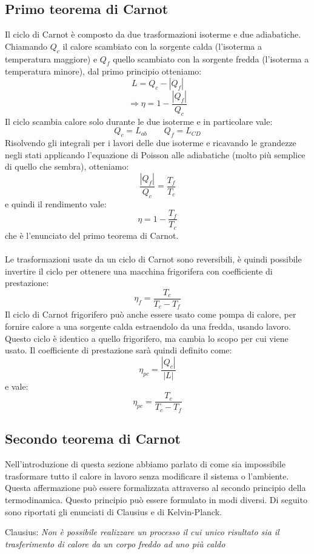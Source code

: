 \documentclass{article}
\begin{document}
\subsection{Primo teorema di Carnot}
Il ciclo di Carnot è composto da due trasformazioni isoterme e due adiabatiche. Chiamando $Q_c$ il calore scambiato con la sorgente calda (l'isoterma a temperatura maggiore) e $Q_f$ quello scambiato con la sorgente fredda (l'isoterma a temperatura minore), dal primo principio otteniamo:
$$ L = Q_c - |Q_f| $$
$$ \Rightarrow \eta = 1 - \frac{|Q_f|}{Q_c} $$
Il ciclo scambia calore solo durante le due isoterme e in particolare vale:
$$ Q_c=L_{ab} \qquad Q_f=L_{CD}$$
Risolvendo gli integrali per i lavori delle due isoterme e ricavando le grandezze negli stati applicando l'equazione di Poisson alle adiabatiche (molto più semplice di quello che sembra), otteniamo:
$$ \frac{|Q_f|}{Q_c} = \frac{T_f}{T_c} $$
e quindi il rendimento vale:
$$ \eta = 1 - \frac{T_f}{T_c} $$
che è l'enunciato del primo teorema di Carnot.\\\\
Le trasformazioni usate da un ciclo di Carnot sono reversibili, è quindi possibile invertire il ciclo per ottenere una macchina frigorifera con coefficiente di prestazione:
$$ \eta_f = \frac{T_c}{T_c-T_f} $$
Il ciclo di Carnot frigorifero può anche essere usato come pompa di calore, per fornire calore a una sorgente calda estraendolo da una fredda, usando lavoro. Questo ciclo è identico a quello frigorifero, ma cambia lo scopo per cui viene usato. Il coefficiente di prestazione sarà quindi definito come:
$$ \eta_{pc} = \frac{|Q_c|}{|L|} $$
e vale:
$$ \eta_{pc} = \frac{T_c}{T_c-T_f} $$

\subsection{Secondo teorema di Carnot}
Nell'introduzione di questa sezione abbiamo parlato di come sia impossibile trasformare tutto il calore in lavoro senza modificare il sistema o l'ambiente. Questa affermazione può essere formalizzata attraverso al secondo principio della termodinamica. Questo principio può essere formulato in modi diversi. Di seguito sono riportati gli enunciati di Clausius e di Kelvin-Planck.
\begin{center}
    Clausius: \textit{Non è possibile realizzare un processo il cui unico risultato sia il trasferimento di calore da un corpo freddo ad uno più caldo}
\end{center}
\end{document}
